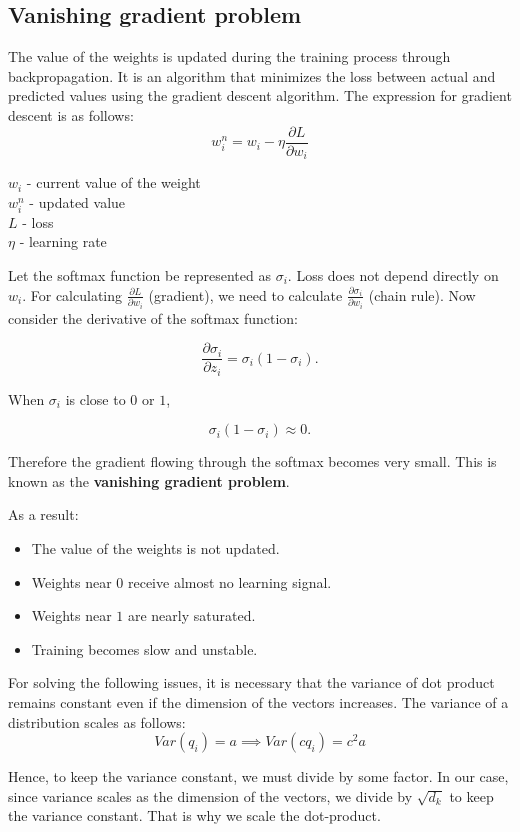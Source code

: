 \subsection{Vanishing gradient problem}

The value of the weights is updated during the training process through backpropagation. It is an algorithm that minimizes the loss between actual and predicted values using the gradient descent algorithm. The expression for gradient descent is as follows:
$$w_i^n = w_i - \eta \frac{\partial L}{\partial w_i}$$

$w_i$ - current value of the weight\\
$w_i^n$ - updated value\\
$L$ - loss\\
$\eta$ - learning rate

Let the softmax function be represented as $\sigma_i$. Loss does not depend directly on $w_i$. For calculating $\frac{\partial L}{\partial w_i}$ (gradient), we need to calculate $\frac{\partial \sigma_i}{\partial w_i}$ (chain rule). Now consider the derivative of the softmax function:

\[
\frac{\partial \sigma_i}{\partial z_i}
=
\sigma_i(1-\sigma_i).
\]

When \(\sigma_i\) is close to \(0\) or \(1\),

\[
\sigma_i(1-\sigma_i)\approx 0.
\]

Therefore the gradient flowing through the softmax becomes very small. This is known as the \textbf{vanishing gradient problem}.

As a result:
\begin{itemize}
    \item The value of the weights is not updated.
    \item Weights near \(0\) receive almost no learning signal.
    \item Weights near \(1\) are nearly saturated.
    \item Training becomes slow and unstable.
\end{itemize}


For solving the following issues, it is necessary that the variance of dot product remains constant even if the dimension of the vectors increases. The variance of a distribution scales as follows:
$$Var(q_i) = a \implies Var(cq_i) = c^2a$$

Hence, to keep the variance constant, we must divide by some factor. In our case, since variance scales as the dimension of the vectors, we divide by $\sqrt{d_k}$ to keep the variance constant. That is why we scale the dot-product.

